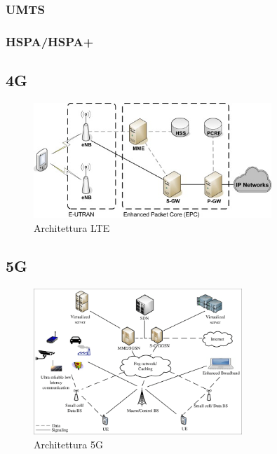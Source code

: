 \subsubsection{UMTS}


\subsubsection{HSPA/HSPA+}


\subsection{4G}
\begin{figure}[ht]
    \centering
    \includegraphics[width=0.8\textwidth]{images/4g-lte.jpg}
    \caption{Architettura LTE}
\end{figure}

\subsection{5G}
\begin{figure}[ht]
    \centering
    \includegraphics[width=0.7\textwidth]{images/5g.png}
    \caption{Architettura 5G}
\end{figure}